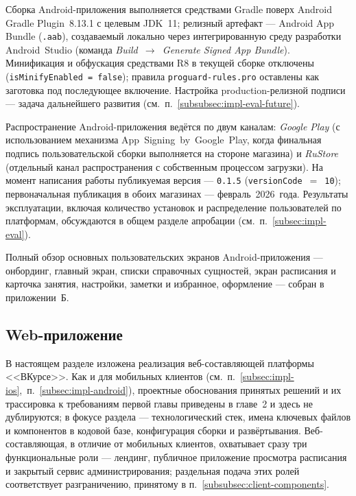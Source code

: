 Сборка Android-приложения выполняется средствами Gradle поверх Android Gradle Plugin~8.13.1 с целевым JDK~11; релизный артефакт --- Android App Bundle (\texttt{.aab}), создаваемый локально через интегрированную среду разработки Android~Studio (команда \emph{Build~$\to$~Generate Signed App Bundle}). Минификация и обфускация средствами R8 в текущей сборке отключены (\texttt{isMinifyEnabled = false}); правила \texttt{proguard-rules.pro} оставлены как заготовка под последующее включение. Настройка production-релизной подписи --- задача дальнейшего развития (см.~п.~\ref{subsubsec:impl-eval-future}).

Распространение Android-приложения ведётся по двум каналам: \emph{Google Play} (с использованием механизма App~Signing~by~Google~Play, когда финальная подпись пользовательской сборки выполняется на стороне магазина) и \emph{RuStore} (отдельный канал распространения с собственным процессом загрузки). На момент написания работы публикуемая версия --- \texttt{0.1.5} (\texttt{versionCode}~$=$~\texttt{10}); первоначальная публикация в обоих магазинах --- февраль~2026~года. Результаты эксплуатации, включая количество установок и распределение пользователей по платформам, обсуждаются в общем разделе апробации (см.~п.~\ref{subsec:impl-eval}).

Полный обзор основных пользовательских экранов Android-приложения --- онбординг, главный экран, списки справочных сущностей, экран расписания и карточка занятия, настройки, заметки и избранное, оформление --- собран в приложении~Б.

\subsection{Web-приложение}
\label{subsec:impl-web}

В настоящем разделе изложена реализация веб-составляющей платформы <<ВКурсе>>. Как и для мобильных клиентов (см.~п.~\ref{subsec:impl-ios},~п.~\ref{subsec:impl-android}), проектные обоснования принятых решений и их трассировка к требованиям первой главы приведены в главе~2 и здесь не дублируются; в фокусе раздела --- технологический стек, имена ключевых файлов и компонентов в кодовой базе, конфигурация сборки и развёртывания. Веб-составляющая, в отличие от мобильных клиентов, охватывает сразу три функциональные роли --- лендинг, публичное приложение просмотра расписания и закрытый сервис администрирования; раздельная подача этих ролей соответствует разграничению, принятому в п.~\ref{subsubsec:client-components}.

